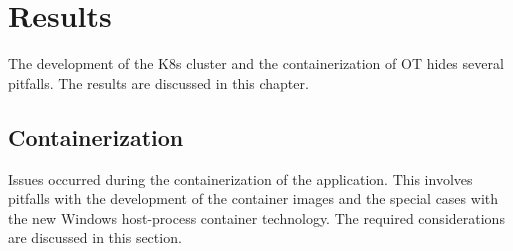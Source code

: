 \chapter{Results} %

\label{chap:results} %


The development of the \ac{K8s} cluster and the containerization of \ac{OT} hides several pitfalls. The results are discussed in this chapter.

\section{Containerization}
Issues occurred during the containerization of the application. This involves pitfalls with the development of the container images and the special cases with the new \ac{Windows} host-process container technology. The required considerations are discussed in this section.

